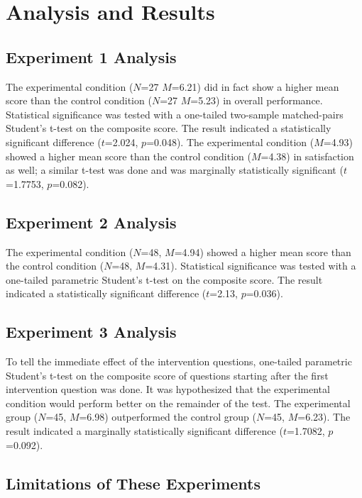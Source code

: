 \section{Analysis and Results}

\subsection{Experiment 1 Analysis} 

The experimental condition ($N$=27 $M$=6.21) did in fact show a higher mean
score than the control condition ($N$=27 $M$=5.23) in overall performance.
Statistical significance was tested with a one-tailed two-sample matched-pairs
Student's t-test on the composite score. The result indicated a statistically
significant difference ($t$=2.024, $p$=0.048).  The experimental condition
($M$=4.93) showed a higher mean score than the control condition ($M$=4.38) in
satisfaction as well; a similar t-test was done and was marginally
statistically significant ($t$=1.7753, $p$=0.082).  


\subsection{Experiment 2 Analysis} 

The experimental condition ($N$=48, $M$=4.94) showed a higher mean score than
the control condition ($N$=48, $M$=4.31).  Statistical significance was tested
with a one-tailed parametric Student's t-test on the composite score.  The
result indicated a statistically significant difference ($t$=2.13, $p$=0.036).

\subsection{Experiment 3 Analysis}

To tell the immediate effect of the intervention questions, one-tailed
parametric Student's t-test on the composite score of questions starting after
the first intervention question was done. It was hypothesized that the
experimental condition would perform better on the remainder of the test. The
experimental group ($N$=45, $M$=6.98) outperformed the control group ($N$=45,
$M$=6.23).  The result indicated a marginally statistically significant
difference ($t$=1.7082, $p$=0.092).

\subsection{Limitations of These Experiments}

